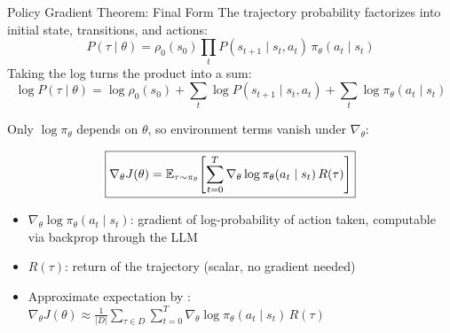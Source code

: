 \begin{frame}{Policy Gradient Theorem: Final Form}
  The trajectory probability factorizes into initial state, transitions, and actions:
  \[
    P(\tau \mid \theta) = \rho_0(s_0) \prod_{t} P(s_{t+1} \mid s_t, a_t) \, \pi_\theta(a_t \mid s_t)
  \]
  Taking the log turns the product into a sum:
  \[
    \log P(\tau \mid \theta) = \log \rho_0(s_0) + \sum_{t} \log P(s_{t+1} \mid s_t, a_t) + \sum_{t} \log \pi_\theta(a_t \mid s_t)
  \]

  \vspace{0.3em}
  Only $\log \pi_\theta$ depends on $\theta$, so environment terms vanish under $\nabla_\theta$:

  \[
    \boxed{\nabla_\theta J(\theta) = \mathbb{E}_{\tau \sim \pi_\theta}\!\left[\sum_{t=0}^{T} \nabla_\theta \log \pi_\theta(a_t \mid s_t) \, R(\tau)\right]}
  \]

  \begin{itemize}
    \item $\nabla_\theta \log \pi_\theta(a_t \mid s_t)$: gradient of log-probability of action taken, computable via backprop through the LLM
    \item $R(\tau)$: return of the trajectory (scalar, no gradient needed)
    \item Approximate expectation by : $\nabla_\theta J(\theta) \approx \frac{1}{|D|} \sum_{\tau \in D} \sum_{t=0}^{T} \nabla_\theta \log \pi_\theta(a_t \mid s_t) \, R(\tau)$
  \end{itemize}
\end{frame}

